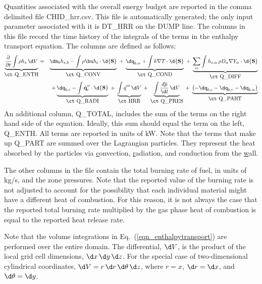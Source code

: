 \documentclass[11pt]{book}
\begin{document}
Quantities associated with the overall energy budget are reported in the comma delimited file {\ct CHID\_hrr.csv}.  This file is automatically generated; the only input parameter associated with it is {\ct DT\_HRR} on the {\ct DUMP} line. The columns in this file record the time history of the integrals of the terms in the enthalpy transport equation. The columns are defined as follows:
\begin{eqnarray}
\label{eqn_enthalpytransport}
\underbrace{\frac{\partial}{\partial t} \int \rho h_s \, \d V }_{\hbox{\ct Q\_ENTH}} &=&
\underbrace{\dm_b h_{s,b} - \int \rho \bu h_{\rm s} \cdot \d {\bf S}}_{\hbox{\ct Q\_CONV}}
\; + \; \underbrace{\dq_{b,w} + \int k \nabla T \cdot \d {\bf S}}_{\hbox{\ct Q\_COND}}
\; + \; \underbrace{\sum_\alpha \int h_{s,\alpha} \, \rho D_\alpha \nabla Y_\alpha \cdot \d {\bf S}}_{\hbox{\ct Q\_DIFF}}  \nonumber \\
&&
+\underbrace{\dq_{b,r} - \int \dot{\mathbf{q}}^{\prime\prime}_{r} \cdot \d {\bf S}}_{\hbox{\ct Q\_RADI}}
\; + \; \underbrace{\int \dot{q}''' \, \d V}_{\hbox{\ct HRR}}
\; + \; \underbrace{\int \frac{d \overline{p} }{\d t} \, \d V}_{\hbox{\ct Q\_PRES}}
\; + \; \underbrace{\left( -\dq_{b,c} - \dq_{b,r} - \dq_{b,w} \right) }_{\hbox{\ct Q\_PART}}
\end{eqnarray}
An additional column, {\ct Q\_TOTAL}, includes the sum of the terms on the right hand side of the equation. Ideally, this sum should equal the term on the left, {\ct Q\_ENTH}. All terms are reported in units of kW. Note that the terms that make up {\ct Q\_PART} are summed over the Lagrangian particles. They represent the heat absorbed by the particles via \underline{c}onvection, \underline{r}adiation, and conduction from the \underline{w}all.

The other columns in the file contain the total burning rate of fuel, in units of kg/s, and the zone pressures. Note that the reported value of the burning rate is not adjusted to account for the possibility that each individual
material might have a different heat of combustion. For this reason, it is not always the case that the reported total burning rate multiplied by the gas phase heat of combustion is equal to the reported heat release rate.

Note that the volume integrations in Eq.~(\ref{eqn_enthalpytransport}) are performed over the entire domain. The differential, $\d V$, is the product of the local grid cell dimensions, $\d x \, \d y \, \d z$. For the special case of two-dimensional cylindrical coordinates, $\d V=r \, \d r \, \d \theta \, \d z$, where $r=x$, $\d r = \d x$, and $\d \theta = \d y$.
\end{document}
